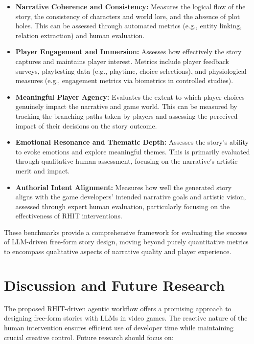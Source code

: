 \documentclass{article}
\begin{document}
\begin{itemize}
    \item \textbf{Narrative Coherence and Consistency:}  Measures the logical flow of the story, the consistency of characters and world lore, and the absence of plot holes.  This can be assessed through automated metrics (e.g., entity linking, relation extraction) and human evaluation.
    \item \textbf{Player Engagement and Immersion:}  Assesses how effectively the story captures and maintains player interest. Metrics include player feedback surveys, playtesting data (e.g., playtime, choice selections), and physiological measures (e.g., engagement metrics via biometrics in controlled studies).
    \item \textbf{Meaningful Player Agency:}  Evaluates the extent to which player choices genuinely impact the narrative and game world.  This can be measured by tracking the branching paths taken by players and assessing the perceived impact of their decisions on the story outcome.
    \item \textbf{Emotional Resonance and Thematic Depth:}  Assesses the story's ability to evoke emotions and explore meaningful themes.  This is primarily evaluated through qualitative human assessment, focusing on the narrative's artistic merit and impact.
    \item \textbf{Authorial Intent Alignment:} Measures how well the generated story aligns with the game developers' intended narrative goals and artistic vision, assessed through expert human evaluation, particularly focusing on the effectiveness of RHIT interventions.
\end{itemize}

These benchmarks provide a comprehensive framework for evaluating the success of LLM-driven free-form story design, moving beyond purely quantitative metrics to encompass qualitative aspects of narrative quality and player experience.

\section{Discussion and Future Research}

The proposed RHIT-driven agentic workflow offers a promising approach to designing free-form stories with LLMs in video games.  The reactive nature of the human intervention ensures efficient use of developer time while maintaining crucial creative control.  Future research should focus on:
\end{document}
